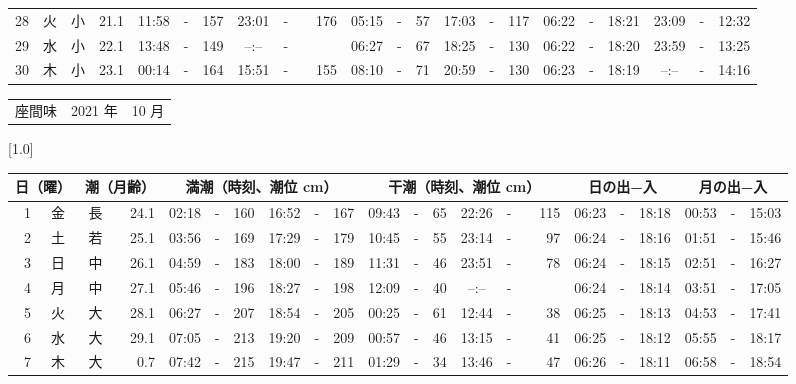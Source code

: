 \documentclass[12pt,a4j]{jsarticle}
\begin{document}
\begin{table}[htbp]
\begin{center}
{\begin{tabular}{|rc|cr|ccrccr|ccrccr|ccc|ccc|}
28 & 火 & 小 & 21.1 &  11:58 &-& 157 &  23:01 &-& 176 &  05:15 &-&  57 &  17:03 &-& 117 & 06:22 & -& 18:21 & 23:09 & -& 12:32 \\
29 & 水 & 小 & 22.1 &  13:48 &-& 149 &  --:-- &-&~~~~~ &  06:27 &-&  67 &  18:25 &-& 130 & 06:22 & -& 18:20 & 23:59 & -& 13:25 \\
30 & 木 & 小 & 23.1 &  00:14 &-& 164 &  15:51 &-& 155 &  08:10 &-&  71 &  20:59 &-& 130 & 06:23 & -& 18:19 & --:-- & -& 14:16 \\
   \hline
   \end{tabular}}
   \end{center}
\end{table}
\newpage
 \begin{table}[htbp]
 \begin{center}
 \begin{tabular}{lcc}
 \LARGE{座間味}  & \large{2021 年} & \large{10 月} \\
 \end{tabular}
 \end{center}
 \begin{center}
    \scalebox{0.7}[1.0]{
    \begin{tabular}{|rc|cr|ccrccr|ccrccr|ccc|ccc|}
    \hline
    \multicolumn{2}{|c|}{日（曜）} & \multicolumn{2}{c|}{潮（月齢）} & \multicolumn{6}{c|}{満潮（時刻、潮位 cm）} & \multicolumn{6}{c|}{干潮（時刻、潮位 cm）} & \multicolumn{3}{c|}{日の出−入} &  \multicolumn{3}{c|}{月の出−入}\\
 \hline
 1 & 金 & 長 & 24.1 &  02:18 &-& 160 &  16:52 &-& 167 &  09:43 &-&  65 &  22:26 &-& 115 & 06:23 & -& 18:18 & 00:53 & -& 15:03 \\
 2 & 土 & 若 & 25.1 &  03:56 &-& 169 &  17:29 &-& 179 &  10:45 &-&  55 &  23:14 &-&  97 & 06:24 & -& 18:16 & 01:51 & -& 15:46 \\
 3 & 日 & 中 & 26.1 &  04:59 &-& 183 &  18:00 &-& 189 &  11:31 &-&  46 &  23:51 &-&  78 & 06:24 & -& 18:15 & 02:51 & -& 16:27 \\
 4 & 月 & 中 & 27.1 &  05:46 &-& 196 &  18:27 &-& 198 &  12:09 &-&  40 &  --:-- &-&~~~~~ & 06:24 & -& 18:14 & 03:51 & -& 17:05 \\
 5 & 火 & 大 & 28.1 &  06:27 &-& 207 &  18:54 &-& 205 &  00:25 &-&  61 &  12:44 &-&  38 & 06:25 & -& 18:13 & 04:53 & -& 17:41 \\
 6 & 水 & 大 & 29.1 &  07:05 &-& 213 &  19:20 &-& 209 &  00:57 &-&  46 &  13:15 &-&  41 & 06:25 & -& 18:12 & 05:55 & -& 18:17 \\
 7 & 木 & 大 &  0.7 &  07:42 &-& 215 &  19:47 &-& 211 &  01:29 &-&  34 &  13:46 &-&  47 & 06:26 & -& 18:11 & 06:58 & -& 18:54 \\

\end{tabular}}
\end{center}
\end{table}
\end{document}
